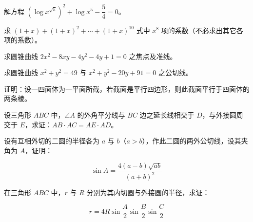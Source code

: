 

\begin{question}
解方程 $\left(\log x^{\sqrt5}\right)^2+\log x^5-\dfrac54=0$。

\end{question}
\begin{question}
求 $(1+x)+(1+x)^2+\cdots+(1+x)^{10}$ 式中 $x^8$ 项的系数（不必求出其它各项的系数）。

\end{question}
\begin{question}
求圆锥曲线 $2x^2-8xy-4y^2-4y+1=0$ 之焦点及准线。

\end{question}
\begin{question}
求圆锥曲线 $x^2+y^2=49$ 与 $x^2+y^2-20y+91=0$ 之公切线。

\end{question}
\begin{question}
证明：设一四面体为一平面所截，若截面是平行四边形，则此截面平行于四面体的两条棱。

\end{question}
\begin{question}
设三角形 $ABC$ 中，$\angle A$ 的外角平分线与 $BC$ 边之延长线相交于 $D$，与外接圆周交于 $E$，求证：$AB\cdot AC=AE\cdot AD$。

\end{question}
\begin{question}
设有互相外切的二圆的半径各为 $a$ 与 $b$（$a>b$），作此二圆的两外公切线，设其夹角为 $A$，证明：

\nopagebreak[4]
\[
\sin A=\frac{4(a-b)\sqrt{ab}}{(a+b)^2}
\]

\end{question}
\begin{question}
在三角形 $ABC$ 中，$r$ 与 $R$ 分别为其内切圆与外接圆的半径，求证：

\nopagebreak[4]
\[
r=4R\sin\frac A2\sin\frac B2\sin\frac C2
\]

\end{question}